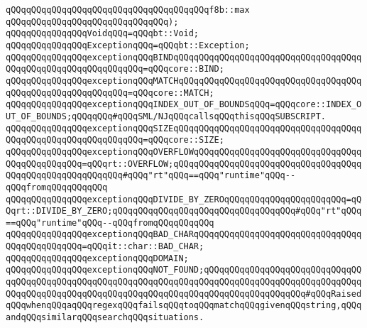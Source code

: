 \verb|qQQqqQQqqQQqqQQqqQQqqQQqqQQqqQQqqQQqqQQqf8b::max|\newline
\verb|qQQqqQQqqQQqqQQqqQQqqQQqqQQqqQQq);|\newline
\newline
\verb|qQQqqQQqqQQqqQQqVoidqQQq=qQQqbt::Void;|\newline
\newline
\verb|qQQqqQQqqQQqqQQqExceptionqQQq=qQQqbt::Exception;|\newline
\newline
\verb|qQQqqQQqqQQqqQQqexceptionqQQqBINDqQQqqQQqqQQqqQQqqQQqqQQqqQQqqQQqqQQqqQQqqQQqqQQqqQQqqQQqqQQqqQQq=qQQqcore::BIND;|\newline
\verb|qQQqqQQqqQQqqQQqexceptionqQQqMATCHqQQqqQQqqQQqqQQqqQQqqQQqqQQqqQQqqQQqqQQqqQQqqQQqqQQqqQQqqQQq=qQQqcore::MATCH;|\newline
\verb|qQQqqQQqqQQqqQQqexceptionqQQqINDEX_OUT_OF_BOUNDSqQQq=qQQqcore::INDEX_OUT_OF_BOUNDS;qQQqqQQq#qQQqSML/NJqQQqcallsqQQqthisqQQqSUBSCRIPT.|\newline
\verb|qQQqqQQqqQQqqQQqexceptionqQQqSIZEqQQqqQQqqQQqqQQqqQQqqQQqqQQqqQQqqQQqqQQqqQQqqQQqqQQqqQQqqQQqqQQq=qQQqcore::SIZE;|\newline
\newline
\verb|qQQqqQQqqQQqqQQqexceptionqQQqOVERFLOWqQQqqQQqqQQqqQQqqQQqqQQqqQQqqQQqqQQqqQQqqQQqqQQq=qQQqrt::OVERFLOW;qQQqqQQqqQQqqQQqqQQqqQQqqQQqqQQqqQQqqQQqqQQqqQQqqQQqqQQqqQQq#qQQq"rt"qQQq==qQQq"runtime"qQQq--qQQqfromqQQqqQQqqQQq|\newline
\verb|qQQqqQQqqQQqqQQqexceptionqQQqDIVIDE_BY_ZEROqQQqqQQqqQQqqQQqqQQqqQQq=qQQqrt::DIVIDE_BY_ZERO;qQQqqQQqqQQqqQQqqQQqqQQqqQQqqQQqqQQq#qQQq"rt"qQQq==qQQq"runtime"qQQq--qQQqfromqQQqqQQqqQQq|\newline
\newline
\verb|qQQqqQQqqQQqqQQqexceptionqQQqBAD_CHARqQQqqQQqqQQqqQQqqQQqqQQqqQQqqQQqqQQqqQQqqQQqqQQq=qQQqit::char::BAD_CHAR;|\newline
\verb|qQQqqQQqqQQqqQQqexceptionqQQqDOMAIN;|\newline
\verb|qQQqqQQqqQQqqQQqexceptionqQQqNOT_FOUND;qQQqqQQqqQQqqQQqqQQqqQQqqQQqqQQqqQQqqQQqqQQqqQQqqQQqqQQqqQQqqQQqqQQqqQQqqQQqqQQqqQQqqQQqqQQqqQQqqQQqqQQqqQQqqQQqqQQqqQQqqQQqqQQqqQQqqQQqqQQqqQQqqQQqqQQqqQQqqQQq#qQQqRaisedqQQqwhenqQQqaqQQqregexqQQqfailsqQQqtoqQQqmatchqQQqgivenqQQqstring,qQQqandqQQqsimilarqQQqsearchqQQqsituations.|\newline

